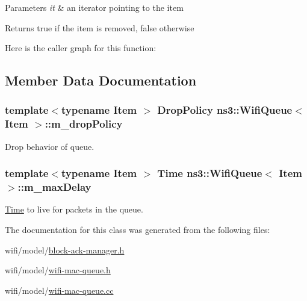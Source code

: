 \begin{DoxyParams}{Parameters}
{\em it} & an iterator pointing to the item \\
\hline
\end{DoxyParams}
\begin{DoxyReturn}{Returns}
true if the item is removed, false otherwise 
\end{DoxyReturn}


Here is the caller graph for this function\+:




\subsection{Member Data Documentation}
\subsubsection[{\texorpdfstring{m\+\_\+drop\+Policy}{m_dropPolicy}}]{\setlength{\rightskip}{0pt plus 5cm}template$<$typename Item $>$ {\bf Drop\+Policy} {\bf ns3\+::\+Wifi\+Queue}$<$ Item $>$\+::m\+\_\+drop\+Policy\hspace{0.3cm}{\ttfamily [private]}}\hypertarget{classns3_1_1WifiQueue_a0dd5aa1773f1bba30d03e07f63e6dc30}{}\label{classns3_1_1WifiQueue_a0dd5aa1773f1bba30d03e07f63e6dc30}


Drop behavior of queue. 

\subsubsection[{\texorpdfstring{m\+\_\+max\+Delay}{m_maxDelay}}]{\setlength{\rightskip}{0pt plus 5cm}template$<$typename Item $>$ {\bf Time} {\bf ns3\+::\+Wifi\+Queue}$<$ Item $>$\+::m\+\_\+max\+Delay\hspace{0.3cm}{\ttfamily [private]}}\hypertarget{classns3_1_1WifiQueue_a03250df9a7461abb71034e610c193093}{}\label{classns3_1_1WifiQueue_a03250df9a7461abb71034e610c193093}


\hyperlink{classns3_1_1Time}{Time} to live for packets in the queue. 



The documentation for this class was generated from the following files\+:\begin{DoxyCompactItemize}
\item 
wifi/model/\hyperlink{block-ack-manager_8h}{block-\/ack-\/manager.\+h}\item 
wifi/model/\hyperlink{wifi-mac-queue_8h}{wifi-\/mac-\/queue.\+h}\item 
wifi/model/\hyperlink{wifi-mac-queue_8cc}{wifi-\/mac-\/queue.\+cc}\end{DoxyCompactItemize}
